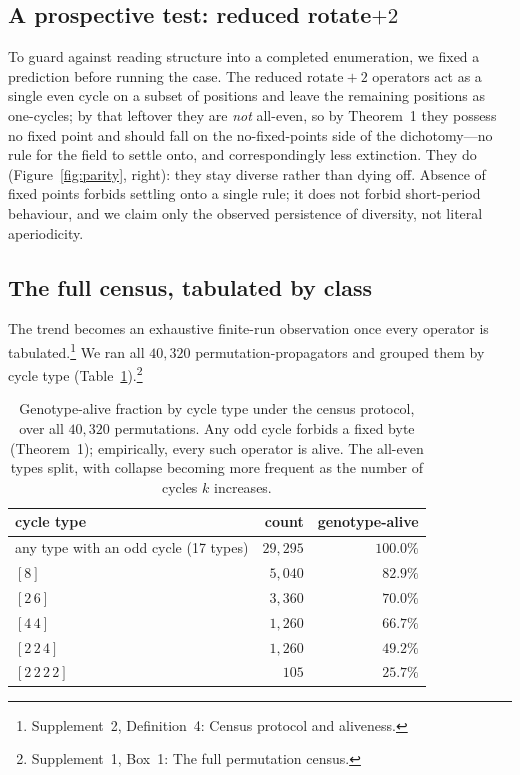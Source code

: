 \documentclass[man,12pt,floatsintext,donotrepeattitle]{apa7}
\newcommand{\suppfindingref}[1]{Supplement~1, Box~#1}
\newcommand{\supptheorytext}[2]{Supplement~2, #1: #2.}
\newcommand{\supptheory}[2]{\footnote{\supptheorytext{#1}{#2}}}
\newcommand{\suppfindingtext}[2]{\suppfindingref{#1}: #2.}
\newcommand{\suppfinding}[2]{\footnote{\suppfindingtext{#1}{#2}}}
\begin{document}
\subsection{A prospective test: reduced \texorpdfstring{rotate$+2$}{rotate+2}}

To guard against reading structure into a completed enumeration, we fixed a
prediction before running the case. The reduced $\text{rotate}{+}2$
operators act as a single even cycle on a subset of positions and leave the
remaining positions as one-cycles; by that leftover they are \emph{not}
all-even, so by Theorem~1 they possess no fixed point and
should fall on the no-fixed-points side of the dichotomy---no rule for the
field to settle onto, and correspondingly less extinction. They do
(Figure~\ref{fig:parity}, right): they stay diverse rather than dying off.
Absence of fixed points forbids settling onto a single rule; it does not
forbid short-period behaviour, and we claim only the observed persistence of
diversity, not literal aperiodicity.

\subsection{The full census, tabulated by class}
\label{sec:full-census}

The trend becomes an exhaustive finite-run observation once every operator is tabulated.\supptheory{Definition~4}{Census protocol and aliveness} We ran all
$40{,}320$ permutation-propagators and grouped them by cycle type
(Table~\ref{tab:census}).\suppfinding{1}{The full permutation census}

\begin{table}[t]
\centering\small
\caption{Genotype-alive fraction by cycle type under the census protocol, over
all $40{,}320$ permutations. Any odd cycle forbids a fixed byte
(Theorem~1); empirically, every such operator is alive. The
all-even types split, with collapse becoming more frequent as the number of
cycles $k$ increases.}
\label{tab:census}
\begin{tabular}{lrr}
\toprule
cycle type & count & genotype-alive \\
\midrule
any type with an odd cycle (17 types) & $29{,}295$ & $100.0\%$ \\
$[8]$        & $5{,}040$ & $82.9\%$ \\
$[2\,6]$     & $3{,}360$ & $70.0\%$ \\
$[4\,4]$     & $1{,}260$ & $66.7\%$ \\
$[2\,2\,4]$  & $1{,}260$ & $49.2\%$ \\
$[2\,2\,2\,2]$ & $105$   & $25.7\%$ \\
\bottomrule
\end{tabular}
\end{table}
\end{document}
